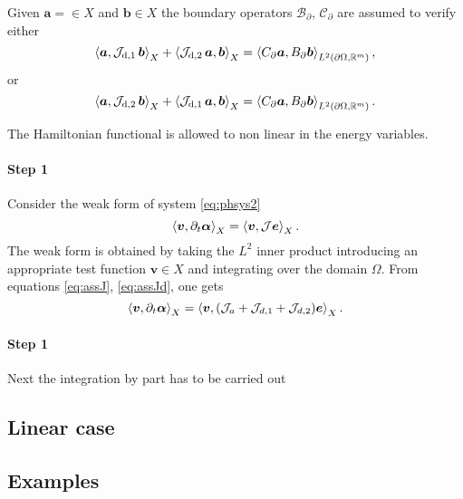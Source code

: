 \begin{assumption}\label{ass:operBC}
	Given $\bm{a} = \in X$ and $\bm{b} \in X$ the boundary operators $\mathcal{B}_\partial, \, \mathcal{C}_\partial$ are assumed to verify either
	\begin{equation}
	\inner[X]{\bm{a}}{\mathcal{J}_{\text{d}, 1}\, \bm{b}} +\inner[X]{\mathcal{J}_{\text{d}, 2}\, \bm{a}}{\bm{b}} = \inner[L^2(\partial \Omega, \mathbb{R}^m)]{C_\partial \bm{a}}{B_\partial  \bm{b}},
	\end{equation}
	or 
	\begin{equation}
	\inner[X]{\bm{a}}{\mathcal{J}_{\text{d}, 2}\, \bm{b}} +\inner[X]{\mathcal{J}_{\text{d}, 1}\, \bm{a}}{\bm{b}} = \inner[L^2(\partial \Omega, \mathbb{R}^m)]{C_\partial \bm{a}}{B_\partial \bm{b}}.
	\end{equation}
\end{assumption}

The Hamiltonian functional is allowed to non linear in the energy variables. 

\paragraph{Step 1} Consider the weak form of system \eqref{eq:phsys2}
\begin{equation}
\inner[X]{\bm{v}}{\partial_t \bm{\alpha}} = \inner[X]{\bm{v}}{\mathcal{J} \bm{e}}.
\end{equation}
The weak form is obtained by taking the $L^2$ inner product introducing an appropriate test function $\bm{v} \in X$ and integrating over the domain $\Omega$. From equations \eqref{eq:assJ}, \eqref{eq:assJd}, one gets 
\begin{equation}
\inner[X]{\bm{v}}{\partial_t \bm{\alpha}} = \inner[X]{\bm{v}}{(\mathcal{J}_a + \mathcal{J}_{d, 1} + \mathcal{J}_{d, 2}) \bm{e}}.
\end{equation}
\paragraph{Step 1} Next the integration by part has to be carried out
\subsection{Linear case}

\subsection{Examples}

